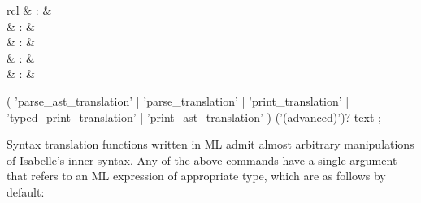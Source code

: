 \begin{isabellebody}
\begin{isamarkuptext}
\begin{description}
  \end{description}%
\end{isamarkuptext}%
\isamarkuptrue%
%
\isamarkuptrue%
%
\begin{isamarkuptext}%
\begin{matharray}{rcl}
    \hypertarget{command.parse-ast-translation}{\hyperlink{command.parse-ast-translation}{\mbox{}}} & : &  \\
    \hypertarget{command.parse-translation}{\hyperlink{command.parse-translation}{\mbox{}}} & : &  \\
    \hypertarget{command.print-translation}{\hyperlink{command.print-translation}{\mbox{}}} & : &  \\
    \hypertarget{command.typed-print-translation}{\hyperlink{command.typed-print-translation}{\mbox{}}} & : &  \\
    \hypertarget{command.print-ast-translation}{\hyperlink{command.print-ast-translation}{\mbox{}}} & : &  \\
  \end{matharray}

  \begin{rail}
  ( 'parse\_ast\_translation' | 'parse\_translation' | 'print\_translation' |
    'typed\_print\_translation' | 'print\_ast\_translation' ) ('(advanced)')? text
  ;
  \end{rail}

  Syntax translation functions written in ML admit almost arbitrary
  manipulations of Isabelle's inner syntax.  Any of the above commands
  have a single  argument that refers to an ML
  expression of appropriate type, which are as follows by default:


\end{isamarkuptext}
\end{isabellebody}
